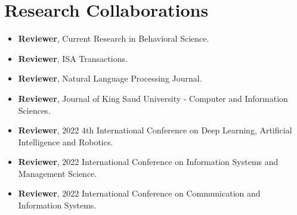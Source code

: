 \section{\textbf{Research Collaborations}}
\begin{itemize}[leftmargin=*,itemsep=2pt,parsep=0pt]
    \item \textbf{Reviewer}, Current Research in Behavioral Science.
    \item \textbf{Reviewer}, ISA Transactions.
    \item \textbf{Reviewer}, Natural Language Processing Journal.
    \item \textbf{Reviewer}, Journal of King Saud University - Computer
    and Information Sciences.
    \item \textbf{Reviewer}, 2022 4th International Conference on Deep Learning,
    Artificial Intelligence and Robotics.
    \item \textbf{Reviewer}, 2022 International Conference on Information Systems
    and Management Science.
    \item \textbf{Reviewer}, 2022 International Conference on Communication and Information
    Systems.
\end{itemize}
